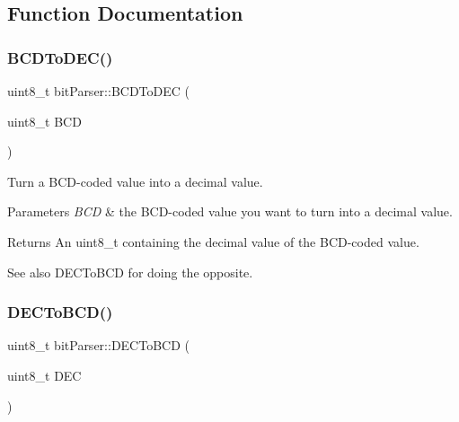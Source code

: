 \subsection{Function Documentation}
\mbox{\label{group__bit_parser_gad207f006665a21b8cbdb0148d81b80c1}} 
\subsubsection{\texorpdfstring{B\+C\+D\+To\+D\+E\+C()}{BCDToDEC()}}
{\footnotesize\ttfamily uint8\+\_\+t bit\+Parser\+::\+B\+C\+D\+To\+D\+EC (\begin{DoxyParamCaption}\item[{uint8\+\_\+t}]{B\+CD }\end{DoxyParamCaption})}



Turn a B\+C\+D-\/coded value into a decimal value. 


\begin{DoxyParams}{Parameters}
{\em B\+CD} & the B\+C\+D-\/coded value you want to turn into a decimal value. \\
\hline
\end{DoxyParams}
\begin{DoxyReturn}{Returns}
An uint8\+\_\+t containing the decimal value of the B\+C\+D-\/coded value. 
\end{DoxyReturn}
\begin{DoxySeeAlso}{See also}
D\+E\+C\+To\+B\+CD for doing the opposite. 
\end{DoxySeeAlso}
\mbox{\label{group__bit_parser_gabf889c80952fe124c224fd61c59704d1}} 
\subsubsection{\texorpdfstring{D\+E\+C\+To\+B\+C\+D()}{DECToBCD()}}
{\footnotesize\ttfamily uint8\+\_\+t bit\+Parser\+::\+D\+E\+C\+To\+B\+CD (\begin{DoxyParamCaption}\item[{uint8\+\_\+t}]{D\+EC }\end{DoxyParamCaption})}




